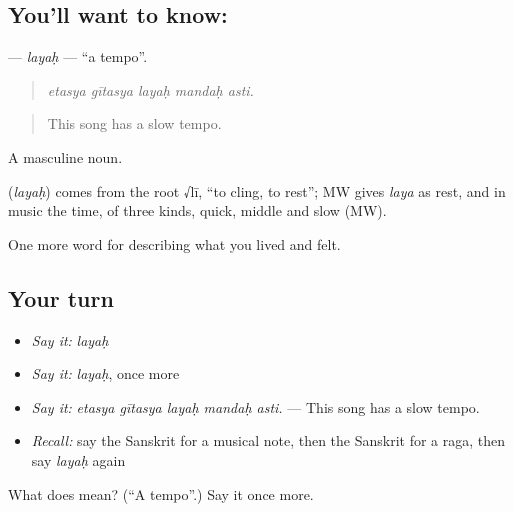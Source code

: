 \subsection*{You'll want to know: }
\textbf{} — \emph{layaḥ} — \textquotedblleft{}a tempo\textquotedblright{}.

\begin{quote}
    
\end{quote}

\begin{quote}
\emph{etasya gītasya layaḥ mandaḥ asti.}
\end{quote}

\begin{quote}
This song has a slow tempo.
\end{quote}

A masculine noun.

\begin{cousinweb}
\textbf{} (\emph{layaḥ}) comes from the root √lī, \textquotedblleft{}to cling, to rest\textquotedblright{}; MW gives \emph{laya} as rest, and in music the time, of three kinds, quick, middle and slow (MW).
\end{cousinweb}

\begin{grammarlens}[title={What you've built}]
One more word for describing what you lived and felt.
\end{grammarlens}

\subsection*{Your turn}
\begin{itemize}
\raggedright
  \item \emph{Say it:} \emph{layaḥ}
  \item \emph{Say it:} \emph{layaḥ}, once more
  \item \emph{Say it:} \emph{etasya gītasya layaḥ mandaḥ asti.} — This song has a slow tempo.
  \item \emph{Recall:} say the Sanskrit for a musical note, then the Sanskrit for a raga, then say \emph{layaḥ} again
\end{itemize}

\begin{tcolorbox}[breakable,colback=teal!4,colframe=teal!35!black,title={Before you move on}]
What does  mean? (\textquotedblleft{}A tempo\textquotedblright{}.) Say it once more.
\end{tcolorbox}

